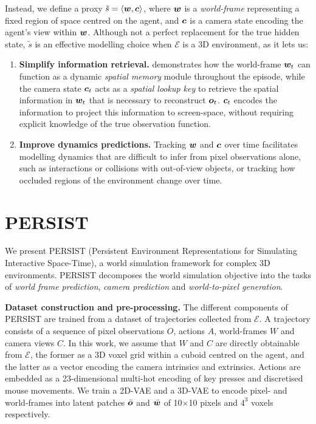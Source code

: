 \documentclass{article}
\theoremstyle{plain}
\theoremstyle{definition}
\theoremstyle{remark}
\begin{document}
Instead, we define a proxy $\tilde{s} = \langle {\bm{w}}, {\bm{c}} \rangle$, where ${\bm{w}}$ is a \textit{world-frame} representing a fixed region of space centred on the agent, and ${\bm{c}}$ is a camera state encoding the agent's view within ${\bm{w}}$.
Although not a perfect replacement for the true hidden state, $\tilde{s}$ is an effective modelling choice when $\mathcal{E}$ is a 3D environment, as it lets us:
\begin{enumerate}[leftmargin=*,nosep]
    \item \textbf{Simplify information retrieval.}  demonstrates how the world-frame ${\bm{w}}_t$ can function as a dynamic \textit{spatial memory} module throughout the episode, while the camera state ${\bm{c}}_t$ acts as a \textit{spatial lookup key} to retrieve the spatial information in ${\bm{w}}_t$ that is necessary to reconstruct ${\bm{o}}_t$. ${\bm{c}}_t$ encodes the information to project this information to screen-space, without requiring explicit knowledge of the true observation function.
    \item \textbf{Improve dynamics predictions.} Tracking ${\bm{w}}$ and ${\bm{c}}$ over time facilitates modelling dynamics that are difficult to infer from pixel observations alone, such as interactions or collisions with out-of-view objects, or tracking how occluded regions of the environment change over time.
\end{enumerate}



\vspace{-0.26cm}
\section{PERSIST}
We present PERSIST (Persistent Environment Representations for Simulating Interactive Space-Time), a world simulation framework for complex 3D environments.
PERSIST decomposes the world simulation objective into the tasks of \textit{world frame prediction}, \textit{camera prediction} and \textit{world-to-pixel generation}.

\textbf{Dataset construction and pre-processing.} The different components of PERSIST are trained from a dataset of trajectories collected from $\mathcal{E}$.
A trajectory consists of a sequence of pixel observations $O$, actions $A$, world-frames $W$ and camera views $C$.
In this work, we assume that $W$ and $C$ are directly obtainable from $\mathcal{E}$, the former as a 3D voxel grid within a cuboid centred on the agent, and the latter as a vector encoding the camera intrinsics and extrinsics.
Actions are embedded as a 23-dimensional multi-hot encoding of key presses and discretised mouse movements.
We train a 2D-VAE and a 3D-VAE to encode pixel- and world-frames into latent patches $\bar{{\bm{o}}}$ and $\bar{{\bm{w}}}$ of 10$\times$10 pixels and $4^3$ voxels respectively. 
\end{document}
